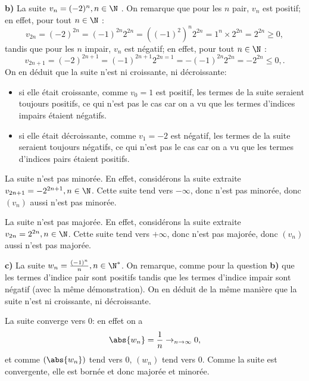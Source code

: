\documentclass[12pt, a4paper,oneside]{article} %
\begin{document}
\textbf{b)}
La suite
$ v_{n} = (-2)^{n}, n \in \N $ 
.
On remarque que pour les $ n $
pair, $ v_{n} $ est positif;
en effet, pour tout $ n \in \N  $ :
\begin{equation}
	v_{2n} =
	(-2)^{2n}
	=
	(-1)^{2n}
	2^{2n} 
	=
	((-1)^{2})^{n} 
	2^{2n} 
	=
	1^{n} 
	\times
	2^{2n} 
	=
	2^{2n} 
	\ge 0
	,
\end{equation}
tandis que pour les
$ n $ impair,
$ v_{n} $ est négatif;
en effet, pour tout $ n \in \N $ :
\begin{equation}
	v_{2n+1} =
	(-2)^{2n+1}
	=
	(-1)^{2n+1}
	2^{2n=1} 
	=
	-(-1)^{2n} 
	2^{2n} 
	=
	- 
	2^{2n} 
	\le 0
	,
	.
\end{equation}
On en déduit que la suite n'est ni
croissante, ni décroissante:
\begin{itemize}
	\item si elle était croissante,
		comme $ v_{0} = 1 $
		est positif,
		les termes de la suite
		seraient toujours positifs,
		ce qui n'est pas le cas
		car on a vu que les termes
		d'indices impairs étaient négatifs.
	\item si elle était décroissante,
		comme $ v_{1} = -2 $
		est négatif,
		les termes de la suite
		seraient toujours négatifs,
		ce qui n'est pas le cas
		car on a vu que les termes
		d'indices pairs étaient positifs.
\end{itemize}

La suite n'est pas minorée.
En effet, considérons la suite 
extraite
$ v_{2n+1} = -2^{2n+1}, n \in \N $.
Cette suite tend vers $ - \infty $,
donc n'est pas minorée,
donc $ (v_{n}) $ aussi n'est pas minorée.

La suite n'est pas majorée.
En effet, considérons la suite 
extraite
$ v_{2n} = 2^{2n}, n \in \N $.
Cette suite tend vers $ + \infty $,
donc n'est pas majorée,
donc $ (v_{n}) $ aussi n'est pas majorée.

\textbf{c)}
La suite
$ w_{n} = \frac{(-1)^{n} }{n}, n \in \N^{*} $.
On remarque, comme pour la
question \textbf{b)}
que les termes d'indice pair
sont positifs
tandis que les termes d'indice 
impair sont négatif
(avec la même démonstration).
On en déduit de la même manière
que la suite n'est ni
croissante, ni décroissante.

La suite converge vers $ 0 $: en effet on a
\begin{equation}
	\abs{w_{n}} = \frac{1}{n}
	\to_{n \to \infty} 0,
\end{equation}
et comme $ (\abs{w_{n}}) $
tend vers $ 0 $,
$ (w_{n})  $ tend vers $ 0 $.
Comme la suite est convergente,
elle est bornée et donc majorée
et minorée.
\end{document}

